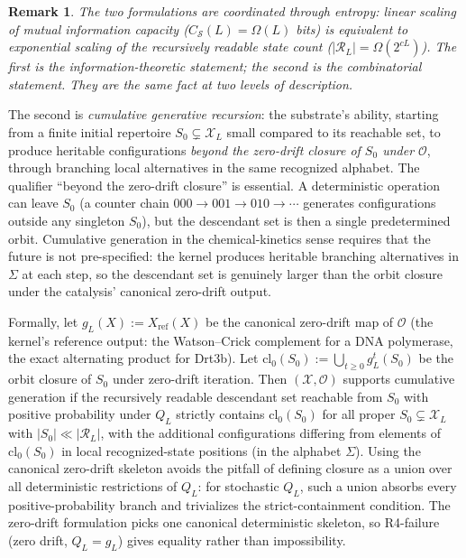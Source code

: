 \documentclass[aps,prx,reprint,amsmath,amssymb,floatfix,superscriptaddress,nofootinbib]{revtex4-2}
\theoremstyle{plain-thm}
\theoremstyle{definition-thm}
\newtheorem{remark}{Remark}
\newcommand{\Csub}{C_{\mathcal{S}}}
\newcommand{\Xset}{\mathcal{X}}
\newcommand{\Op}{\mathcal{O}}
\newcommand{\Reach}{\mathcal{R}}
\begin{document}
\begin{remark}
The two formulations are coordinated through entropy: linear scaling of mutual information capacity ($\Csub(L) = \Omega(L)$ bits) is equivalent to exponential scaling of the recursively readable state count ($|\Reach_L| = \Omega(2^{cL})$). The first is the information-theoretic statement; the second is the combinatorial statement. They are the same fact at two levels of description.
\end{remark}

The second is \emph{cumulative generative recursion}: the substrate's ability, starting from a finite initial repertoire $S_0 \subsetneq \Xset_L$ small compared to its reachable set, to produce heritable configurations \emph{beyond the zero-drift closure of $S_0$ under $\Op$}, through branching local alternatives in the same recognized alphabet. The qualifier ``beyond the zero-drift closure'' is essential. A deterministic operation can leave $S_0$ (a counter chain $000 \to 001 \to 010 \to \cdots$ generates configurations outside any singleton $S_0$), but the descendant set is then a single predetermined orbit. Cumulative generation in the chemical-kinetics sense requires that the future is not pre-specified: the kernel produces heritable branching alternatives in $\Sigma$ at each step, so the descendant set is genuinely larger than the orbit closure under the catalysis' canonical zero-drift output.

Formally, let $g_L(X) := X_{\mathrm{ref}}(X)$ be the canonical zero-drift map of $\Op$ (the kernel's reference output: the Watson--Crick complement for a DNA polymerase, the exact alternating product for Drt3b). Let $\mathrm{cl}_0(S_0) := \bigcup_{t \ge 0} g_L^t(S_0)$ be the orbit closure of $S_0$ under zero-drift iteration. Then $(\Xset, \Op)$ supports cumulative generation if the recursively readable descendant set reachable from $S_0$ with positive probability under $Q_L$ strictly contains $\mathrm{cl}_0(S_0)$ for all proper $S_0 \subsetneq \Xset_L$ with $|S_0| \ll |\Reach_L|$, with the additional configurations differing from elements of $\mathrm{cl}_0(S_0)$ in local recognized-state positions (in the alphabet $\Sigma$). Using the canonical zero-drift skeleton avoids the pitfall of defining closure as a union over all deterministic restrictions of $Q_L$: for stochastic $Q_L$, such a union absorbs every positive-probability branch and trivializes the strict-containment condition. The zero-drift formulation picks one canonical deterministic skeleton, so R4-failure (zero drift, $Q_L = g_L$) gives equality rather than impossibility.
\end{document}

